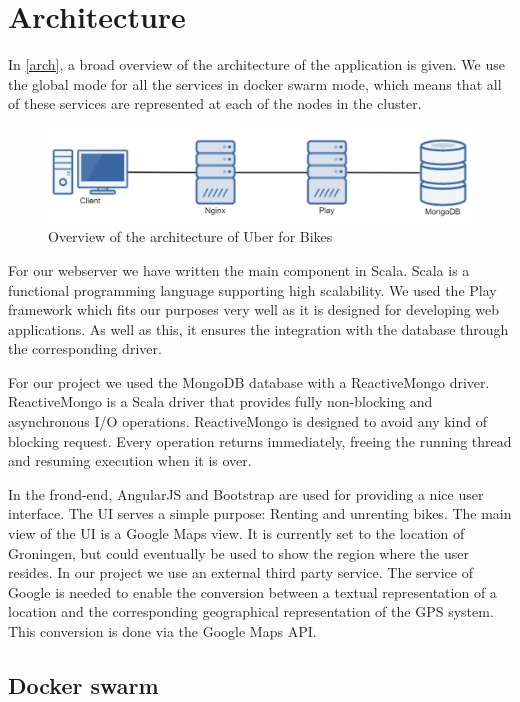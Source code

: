 \section{Architecture}

In \autoref{arch}, a broad overview of the architecture of the application is given. We use the global mode for all the services in docker swarm mode, which means that all of these services are represented at each of the nodes in the cluster.

    \begin{figure}[H]
		\centering
		\includegraphics[width=1.0\textwidth]{images/Architecture.png}
		\caption{Overview of the architecture of Uber for Bikes}
		\label{arch}
	\end{figure}

For our webserver we have written the main component in Scala. Scala is a functional programming language supporting high scalability. We used the Play framework which fits our purposes very well as it is designed for developing web applications.  As well as this, it ensures the integration with the database through the corresponding driver. 

For our project we used the MongoDB database with a ReactiveMongo driver. ReactiveMongo is a Scala driver that provides fully non-blocking and asynchronous I/O operations. ReactiveMongo is designed to avoid any kind of blocking request. Every operation returns immediately, freeing the running thread and resuming execution when it is over.

In the frond-end, AngularJS and Bootstrap are used for providing a nice user interface. The UI serves a simple purpose: Renting and unrenting bikes. The main view of the UI is a Google Maps view. It is currently set to the location of Groningen, but could eventually be used to show the region where the user resides.
In our project we use an external third party service. The service of Google is needed to enable the conversion between a textual representation of a location and the corresponding geographical representation of the GPS system. This conversion is done via the Google Maps API.

\subsection{Docker swarm}

